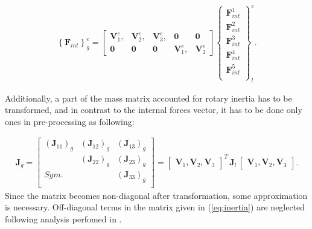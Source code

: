 \documentclass[sensors,article,submit,moreauthors,pdftex]{Definitions/mdpi}
\begin{document}
\begin{eqnarray}
	\left\{\textbf{F}_{int}\right\}^e_g =
	\left [\begin{array}{ccccc}
		\textbf{V}^e_1, & \textbf{V}^e_2, & \textbf{V}^e_3, & \textbf{0} & \textbf{0} \\
		\textbf{0} & \textbf{0} & \textbf{0} & \textbf{V}^e_1, & \textbf{V}^e_2
	\end{array}\right ]
	\left \{\begin{array}{c}
		\textbf{F}^1_{int} \\
		\textbf{F}^2_{int} \\
		\textbf{F}^3_{int} \\
		\textbf{F}^4_{int} \\
		\textbf{F}^5_{int} \\
	\end{array}\right \}_l^e.
	\label{eq:f_global}
\end{eqnarray}

Additionally, a part of the mass matrix accounted for rotary inertia has to be transformed, and in contrast to the internal forces vector, it has to be done only ones in pre-processing as following:

\begin{eqnarray}
\textbf{J}_g=\left [ 
\begin{array}{ccc}
	\left (\textbf{J}_{11}\right )_g & \left (\textbf{J}_{12}\right )_g & \left (\textbf{J}_{13}\right )_g\\
	 & \left (\textbf{J}_{22}\right )_g & \left (\textbf{J}_{23}\right )_g\\
	Sym. &  & \left (\textbf{J}_{33}\right )_g\\
\end{array}
\right ]
=\left[\begin{array}{ccc}
	\textbf{V}_1, \textbf{V}_2, \textbf{V}_3 \end{array}\right ]^T
\,\textbf{J}_l\,
\left[\begin{array}{ccc}
	\textbf{V}_1, \textbf{V}_2, \textbf{V}_3 \end{array}\right ].
\label{eq:inertia}
\end{eqnarray}
Since the matrix becomes non-diagonal after transformation, some approximation is necessary.
Off-diagonal terms in the matrix given in (\ref{eq:inertia}) are neglected following analysis perfomed in \cite{surana1980transition}.
\end{document}
